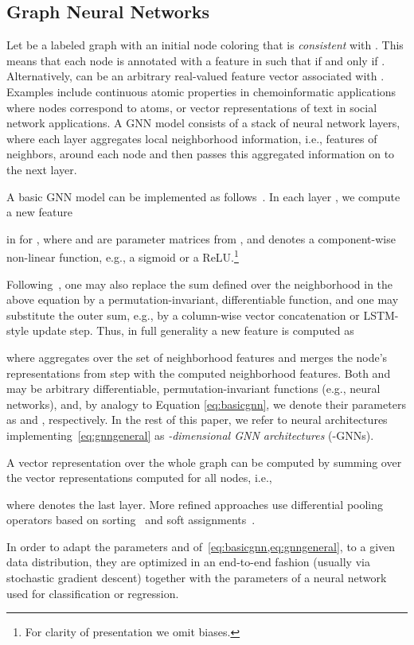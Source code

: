 \documentclass[letterpaper]{article}
\theoremstyle{definition}
\begin{document}
\subsection{Graph Neural Networks}
Let  be a labeled graph with an initial node coloring  that is \emph{consistent} with .
This means that each node  is annotated with a feature  in  such that  if and only if .
Alternatively,  can be an arbitrary  real-valued feature vector associated with .
Examples include continuous atomic properties in chemoinformatic applications where nodes correspond to atoms, or vector representations of text in social network applications. 
A GNN model consists of a stack of neural network layers, where each layer aggregates local neighborhood information, i.e., features of neighbors, around each node and then passes this aggregated information on to the next layer. 

A basic GNN model can be implemented as follows~\cite{Ham+2017a}.
In each layer ,  we compute a new feature 

in   for , where 
 and  are parameter matrices from 
, and  denotes a component-wise non-linear function, e.g., a sigmoid or a ReLU.\footnote{For clarity of presentation we omit biases.}

Following~\cite{Gil+2017}, one may also replace the sum defined over the neighborhood in the above equation by a permutation-invariant, differentiable function, and one may substitute the outer sum, e.g., by a column-wise vector concatenation or LSTM-style update step.
Thus, in full generality a new feature  is computed as

where  aggregates over the set of neighborhood features and  merges the node's representations from step  with the computed neighborhood features.
Both  and  may be arbitrary differentiable, permutation-invariant functions (e.g., neural networks), and, by analogy to Equation \ref{eq:basicgnn}, we denote their parameters as  and , respectively. 
In the rest of this paper, we refer to neural architectures implementing~\cref{eq:gnngeneral} as \emph{-dimensional GNN architectures} (-GNNs).

A vector representation  over the whole graph can be computed by summing over the vector representations computed for all nodes, i.e.,  

where  denotes the last layer. More refined approaches use differential pooling operators based on sorting~\cite{Zha+2018} and soft assignments~\cite{Yin+2018}. 

In order to adapt the parameters  and  of~\cref{eq:basicgnn,eq:gnngeneral}, to a given data distribution, they are optimized in an end-to-end  fashion (usually via stochastic gradient descent) together with the parameters of a neural network used for classification or regression.
\end{document}

